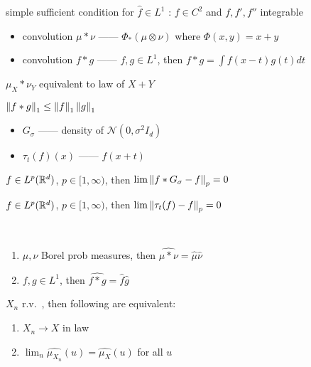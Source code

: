 \begin{fact}
    simple sufficient condition for $\widehat{f} \in L^1$ : $f \in C^2$ and $f, f', f''$ integrable
\end{fact}

\begin{itemize}
    \item convolution $\mu \ast\nu$ ------ $\Phi_\ast(\mu \otimes \nu)$ where $\Phi(x, y) = x + y$
    \item convolution $f \ast g$ ------ $f, g \in L^1$, then $f \ast g = \int f(x-t)g(t)dt$
\end{itemize}

\begin{fact}
    $\mu_X \ast \nu_Y$ equivalent to law of $X+Y$
\end{fact}

\begin{fact}
    $\left\lVert f \ast g\right\rVert_1 \leq \left\lVert f\right\rVert_1\left\lVert g\right\rVert_{1}$
\end{fact}

\begin{itemize}
    \item $G_\sigma$ ------ density of $\mathcal{N}(0, \sigma^2 I_d)$
    \item $\tau_t(f)(x)$ ------ $f(x + t)$
\end{itemize}

\begin{prop}
    $f \in L^p(\mathbb{R}^d)$, $p \in [1, \infty)$, then $\lim \left\lVert f \ast G_\sigma - f\right\rVert_p = 0$
\end{prop}

\begin{lemma}
    $f \in L^p(\mathbb{R}^d)$, $p \in [1, \infty)$, then $\lim \left\lVert\tau_t(f) - f\right\rVert_p = 0$
\end{lemma}

\begin{prop}\,
    \begin{enumerate}
        \item $\mu, \nu$ Borel prob measures, then $\widehat{\mu \ast \nu} = \widehat{\mu}\widehat{\nu}$
        \item $f, g \in L^1$, then $\widehat{f \ast g} = \widehat{f}\widehat{g}$
    \end{enumerate}
\end{prop}

\begin{thm}
    $X_n$ r.v.\ , then following are equivalent:
    \begin{enumerate}
        \item $X_n \rightarrow X$ in law
        \item $\lim_n \widehat{\mu_{X_n}}(u) = \widehat{\mu_X}(u)$ for all $u$
    \end{enumerate}
\end{thm}

